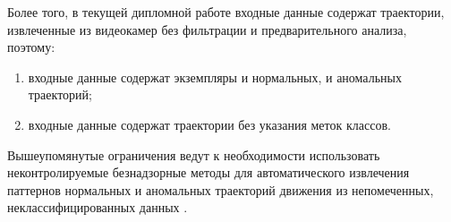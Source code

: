 Более того, в текущей дипломной работе входные данные содержат траектории, извлеченные из видеокамер без фильтрации и предварительного анализа, поэтому:

\begin{enumerate}
	\item входные данные содержат экземпляры и нормальных, и аномальных траекторий;
	\item входные данные содержат траектории без указания меток классов.
\end{enumerate}

Вышеупомянутые ограничения ведут к необходимости использовать неконтролируемые безнадзорные методы для автоматического извлечения паттернов нормальных и аномальных траекторий движения из непомеченных, неклассифицированных данных \cite{article:27_vna_cad_td}.
